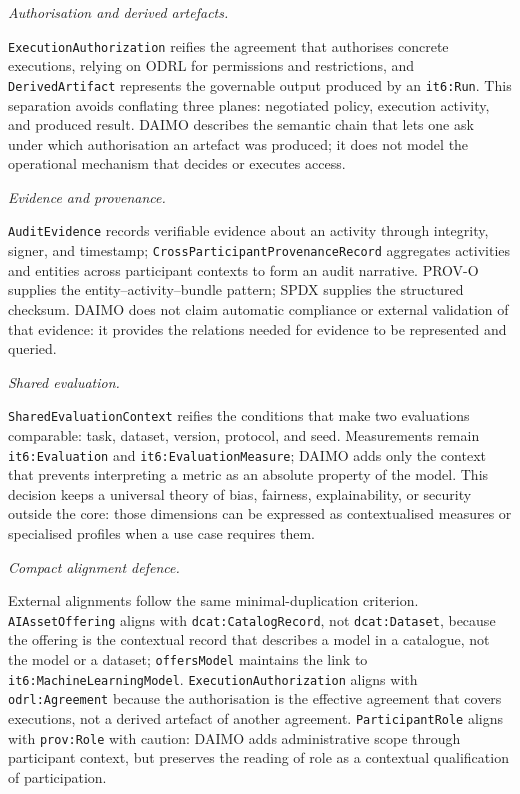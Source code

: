 \documentclass[Afour,sagev,times]{sagej}
\newcommand{\code}[1]{\texttt{#1}}
\begin{document}
\medskip\noindent\emph{Authorisation and derived artefacts.}\par\nobreak\noindent
\code{ExecutionAuthorization} reifies the agreement that authorises concrete executions, relying on ODRL for permissions and restrictions, and \code{DerivedArtifact} represents the governable output produced by an \code{it6:Run}. This separation avoids conflating three planes: negotiated policy, execution activity, and produced result. DAIMO describes the semantic chain that lets one ask under which authorisation an artefact was produced; it does not model the operational mechanism that decides or executes access.

\medskip\noindent\emph{Evidence and provenance.}\par\nobreak\noindent
\code{AuditEvidence} records verifiable evidence about an activity through integrity, signer, and timestamp; \code{CrossParticipantProvenanceRecord} aggregates activities and entities across participant contexts to form an audit narrative. PROV-O supplies the entity--activity--bundle pattern; SPDX supplies the structured checksum. DAIMO does not claim automatic compliance or external validation of that evidence: it provides the relations needed for evidence to be represented and queried.

\medskip\noindent\emph{Shared evaluation.}\par\nobreak\noindent
\code{SharedEvaluationContext} reifies the conditions that make two evaluations comparable: task, dataset, version, protocol, and seed. Measurements remain \code{it6:Evaluation} and \code{it6:EvaluationMeasure}; DAIMO adds only the context that prevents interpreting a metric as an absolute property of the model. This decision keeps a universal theory of bias, fairness, explainability, or security outside the core: those dimensions can be expressed as contextualised measures or specialised profiles when a use case requires them.

\medskip\noindent\emph{Compact alignment defence.}\label{sec:alignment-defense}\par\nobreak\noindent
External alignments follow the same minimal-duplication criterion. \code{AIAssetOffering} aligns with \code{dcat:CatalogRecord}, not \code{dcat:Dataset}, because the offering is the contextual record that describes a model in a catalogue, not the model or a dataset; \code{offersModel} maintains the link to \code{it6:MachineLearningModel}. \code{ExecutionAuthorization} aligns with \code{odrl:Agreement} because the authorisation is the effective agreement that covers executions, not a derived artefact of another agreement. \code{ParticipantRole} aligns with \code{prov:Role} with caution: DAIMO adds administrative scope through participant context, but preserves the reading of role as a contextual qualification of participation.
\end{document}
